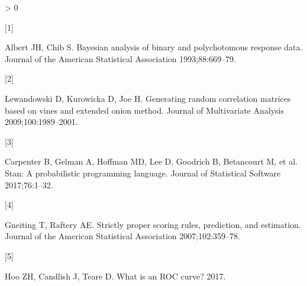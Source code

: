 \documentclass[]{elsarticle} %
\newlength{\cslhangindent}
\newlength{\csllabelwidth}
\newenvironment{CSLReferences}[2] %
 {%
  \setlength{\parindent}{0pt}
  \ifodd #1 \everypar{\setlength{\hangindent}{\cslhangindent}}\ignorespaces\fi
  \ifnum #2 > 0
  \setlength{\parskip}{#2\baselineskip}
  \fi
 }%
 {}
\newcommand{\CSLLeftMargin}[1]{\parbox[t]{\csllabelwidth}{#1}}
\newcommand{\CSLRightInline}[1]{\parbox[t]{\linewidth - \csllabelwidth}{#1}\break}
\begin{document}
\hypertarget{refs}{}
\begin{CSLReferences}{0}{0}
\leavevmode\hypertarget{ref-albert1993bayesian}{}%
\CSLLeftMargin{{[}1{]} }
\CSLRightInline{Albert JH, Chib S. Bayesian analysis of binary and polychotomous response data. Journal of the American Statistical Association 1993;88:669--79.}

\leavevmode\hypertarget{ref-lewandowski2009generating}{}%
\CSLLeftMargin{{[}2{]} }
\CSLRightInline{Lewandowski D, Kurowicka D, Joe H. Generating random correlation matrices based on vines and extended onion method. Journal of Multivariate Analysis 2009;100:1989--2001.}

\leavevmode\hypertarget{ref-carpenter2017stan}{}%
\CSLLeftMargin{{[}3{]} }
\CSLRightInline{Carpenter B, Gelman A, Hoffman MD, Lee D, Goodrich B, Betancourt M, et al. Stan: A probabilistic programming language. Journal of Statistical Software 2017;76:1--32.}

\leavevmode\hypertarget{ref-gneiting2007strictly}{}%
\CSLLeftMargin{{[}4{]} }
\CSLRightInline{Gneiting T, Raftery AE. Strictly proper scoring rules, prediction, and estimation. Journal of the American Statistical Association 2007;102:359--78.}

\leavevmode\hypertarget{ref-hoo2017roc}{}%
\CSLLeftMargin{{[}5{]} }
\CSLRightInline{Hoo ZH, Candlish J, Teare D. What is an ROC curve? 2017.}

\end{CSLReferences}
\end{document}
